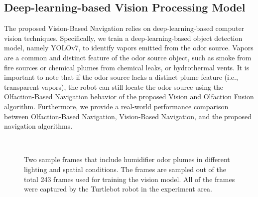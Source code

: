\subsection{Deep-learning-based Vision Processing Model}\label{Subsec:fusion_vision-model}
The proposed Vision-Based Navigation relies on deep-learning-based computer vision techniques. Specifically, we train a deep-learning-based object detection model, namely YOLOv7, to identify vapors emitted from the odor source. Vapors are a common and distinct feature of the odor source object, such as smoke from fire sources or chemical plumes from chemical leaks, or hydrothermal vents. It is important to note that if the odor source lacks a distinct plume feature (i.e., transparent vapors), the robot can still locate the odor source using the Olfaction-Based Navigation behavior of the proposed Vision and Olfaction Fusion algorithm. Furthermore, we provide a real-world performance comparison between Olfaction-Based Navigation, Vision-Based Navigation, and the proposed navigation algorithms.

\begin{figure}[h] %

\ \\
\vspace*{-.18in}

\begin{center}
    \hspace*{0.04in}
    \hspace*{0.04in}
\end{center}
\vspace{-.1in}

\caption
{Two sample frames that include humidifier odor plumes in different lighting and spatial conditions. The frames are sampled out of the total 243 frames used for training the vision model. All of the frames were captured by the Turtlebot robot in the experiment area.}
\label{fig:visionModelTrainingData}
\end{figure}

